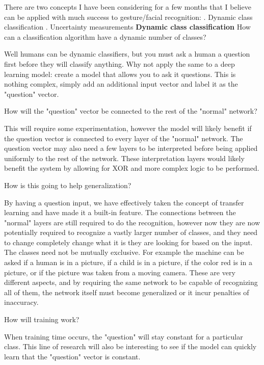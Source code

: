 \documentclass{article}
\newcommand{\br}{ \hfill \break}
\begin{document}
%
%
%
\date{Feb 18 2020} \br \begin{adjustwidth}{2.5em}{0pt}
There are two concepts I have been considering for a few months that I believe can be applied with much success to gesture/facial recognition: \br
1. Dynamic class classification\br
2. Uncertainty measurements\br
\br
\textbf{Dynamic class classification}\br
How can a classification algorithm have a dynamic number of classes?
\br\begin{adjustwidth}{2.5em}{0pt}
Well humans can be dynamic classifiers, but you must ask a human a question first before they will classify anything. Why not apply the same to a deep learning model: create a model that allows you to ask it questions. This is nothing complex, simply add an additional input vector and label it as the "question" vector. 
\end{adjustwidth}\br
How will the "question" vector be connected to the rest of the "normal" network?
\br\begin{adjustwidth}{2.5em}{0pt}
This will require some experimentation, however the model will likely benefit if the question vector is connected to every layer of the "normal" network. The question vector may also need a few layers to be interpreted before being applied uniformly to the rest of the network. These interpretation layers would likely benefit the system by allowing for XOR and more complex logic to be performed.
\end{adjustwidth} \br
How is this going to help generalization?
\br\begin{adjustwidth}{2.5em}{0pt}
By having a question input, we have effectively taken the concept of transfer learning and have made it a built-in feature. The connections between the "normal" layers are still required to do the recognition, however now they are now potentially required to recognize a vastly larger number of classes, and they need to change completely change what it is they are looking for based on the input. The classes need not be mutually exclusive. For example the machine can be asked if a human is in a picture, if a child is in a picture, if the color red is in a picture, or if the picture was taken from a moving camera. These are very different aspects, and by requiring the same network to be capable of recognizing all of them, the network itself must become generalized or it incur penalties of inaccuracy.
\end{adjustwidth} \br
How will training work?
\br\begin{adjustwidth}{2.5em}{0pt}
 When training time occurs, the "question" will stay constant for a particular class. This line of research will also be interesting to see if the model can quickly learn that the "question" vector is constant.

\end{adjustwidth}
\end{adjustwidth}
\end{document}
